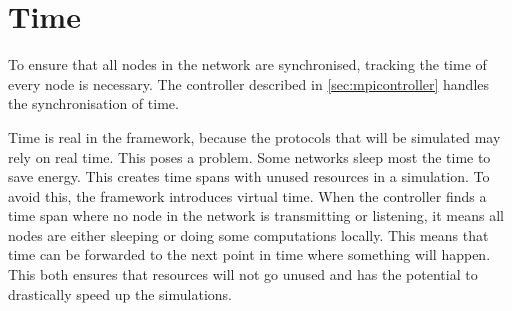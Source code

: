 \section{Time}\label{sec:mpi:time}

To ensure that all nodes in the network are synchronised, tracking the time of every node is necessary. The controller described in \autoref{sec:mpicontroller} handles the synchronisation of time. 

Time is real in the framework, because the protocols that will be simulated may rely on real time. This poses a problem. Some networks sleep most the time to save energy. This creates time spans with unused resources in a simulation. To avoid this, the framework introduces virtual time. When the controller finds a time span where no node in the network is transmitting or listening, it means all nodes are either sleeping or doing some computations locally. This means that time can be forwarded to the next point in time where something will happen. This both ensures that resources will not go unused and has the potential to drastically speed up the simulations.